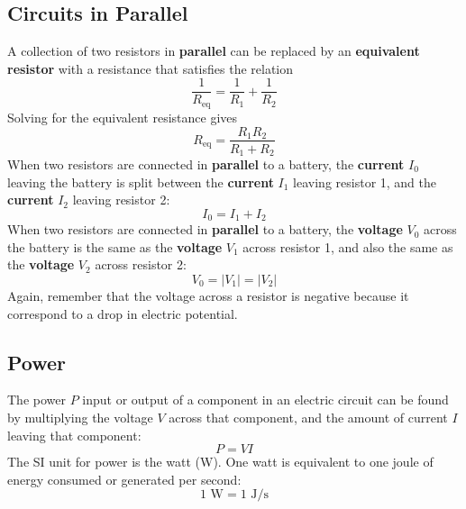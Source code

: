 \subsection{Circuits in Parallel}
A collection of two resistors in \textbf{parallel} can be replaced by an \textbf{equivalent resistor} with a resistance that satisfies the relation
\begin{equation}
	\frac{1}{R_{\text{eq}}} = \frac{1}{R_{1}} + \frac{1}{R_{2}}
\end{equation}
Solving for the equivalent resistance gives
\begin{equation} \label{eq.03.RParallel}
	R_{\text{eq}} = \frac{R_{1} R_{2}}{R_{1} + R_{2}}
\end{equation}
When two resistors are connected in \textbf{parallel} to a battery, the \textbf{current} $I_{0}$ leaving the battery is split between the \textbf{current} $I_{1}$ leaving resistor 1, and the \textbf{current} $I_{2}$ leaving resistor 2:
\begin{equation} \label{eq.03.IParallel}
	I_{0} = I_{1} + I_{2}
\end{equation}
When two resistors are connected in \textbf{parallel} to a battery, the \textbf{voltage} $V_{0}$ across the battery is the same as the \textbf{voltage} $V_{1}$ across resistor 1, and also the same as the \textbf{voltage} $V_{2}$ across resistor 2:
\begin{equation} \label{eq.03.VParallel}
	V_{0} = \left| V_{1} \right| = \left| V_{2} \right|
\end{equation}
Again, remember that the voltage across a resistor is negative because it correspond to a drop in electric potential.
\subsection{Power}
The power $P$ input or output of a component in an electric circuit can be found by multiplying the voltage $V$ across that component, and the amount of current $I$ leaving that component:
\begin{equation}
	P = VI
\end{equation}
The SI unit for power is the watt (W). One watt is equivalent to one joule of energy consumed or generated per second:
\begin{equation}
	1 \text{ W} = 1 \text{ J/s}
\end{equation}

